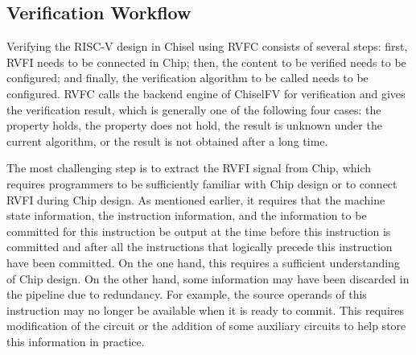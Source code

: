 \documentclass[conference]{IEEEtran}
\theoremstyle{definition}
\begin{document}
\subsection{Verification Workflow}
Verifying the RISC-V design in Chisel using RVFC consists of several steps: first, RVFI needs to be connected in Chip; then, the content to be verified needs to be configured; and finally, the verification algorithm to be called needs to be configured.
RVFC calls the backend engine of ChiselFV for verification and gives the verification result, which is generally one of the following four cases: the property holds, the property does not hold, the result is unknown under the current algorithm, or the result is not obtained after a long time.

The most challenging step is to extract the RVFI signal from Chip, which requires programmers to be sufficiently familiar with Chip design or to connect RVFI during Chip design.
As mentioned earlier, it requires that the machine state information, the instruction information, and the information to be committed for this instruction be output at the time before this instruction is committed and after all the instructions that logically precede this instruction have been committed.
On the one hand, this requires a sufficient understanding of Chip design.
On the other hand, some information may have been discarded in the pipeline due to redundancy.
For example, the source operands of this instruction may no longer be available when it is ready to commit.
This requires modification of the circuit or the addition of some auxiliary circuits to help store this information in practice.
\end{document}
